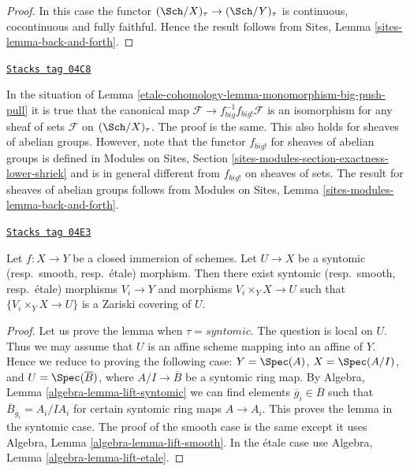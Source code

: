 \begin{proof}
In this case the functor $(\Sch/X)_\tau \to (\Sch/Y)_\tau$
is continuous, cocontinuous and fully faithful. Hence the result follows from
Sites, Lemma \ref{sites-lemma-back-and-forth}.
\end{proof}

\begin{remark}
\label{etale-cohomology-remark-push-pull-shriek}
\href{https://stacks.math.columbia.edu/tag/04C8}{\texttt{Stacks tag 04C8}}

In the situation of
Lemma \ref{etale-cohomology-lemma-monomorphism-big-push-pull}
it is true that the canonical map
$\mathcal{F} \to f_{big}^{-1}f_{big!}\mathcal{F}$
is an isomorphism for any sheaf of sets $\mathcal{F}$ on
$(\Sch/X)_\tau$. The proof is the same. This also
holds for sheaves of abelian groups. However, note
that the functor $f_{big!}$ for sheaves of abelian groups is defined in
Modules on Sites, Section \ref{sites-modules-section-exactness-lower-shriek}
and is in general different from $f_{big!}$ on sheaves of sets.
The result for sheaves of abelian groups follows from
Modules on Sites, Lemma \ref{sites-modules-lemma-back-and-forth}.
\end{remark}

\begin{lemma}
\label{etale-cohomology-lemma-closed-immersion-cover-from-below}
\href{https://stacks.math.columbia.edu/tag/04E3}{\texttt{Stacks tag 04E3}}

Let $f : X \to Y$ be a closed immersion of schemes.
Let $U \to X$ be a syntomic (resp.\ smooth, resp.\ \'etale) morphism.
Then there exist syntomic (resp.\ smooth, resp.\ \'etale) morphisms
$V_i \to Y$ and morphisms $V_i \times_Y X \to U$ such that
$\{V_i \times_Y X \to U\}$ is a Zariski covering of $U$.
\end{lemma}

\begin{proof}
Let us prove the lemma when $\tau = syntomic$.
The question is local on $U$. Thus we may assume that $U$ is
an affine scheme mapping into an affine of $Y$.
Hence we reduce to proving the following case:
$Y = \Spec(A)$, $X = \Spec(A/I)$, and
$U = \Spec(\overline{B})$, where
$A/I \to \overline{B}$ be a syntomic ring map.
By Algebra, Lemma \ref{algebra-lemma-lift-syntomic}
we can find elements $\overline{g}_i \in \overline{B}$
such that
$\overline{B}_{\overline{g}_i} = A_i/IA_i$ for certain syntomic ring maps
$A \to A_i$.
This proves the lemma in the syntomic case.
The proof of the smooth case is the same except it uses
Algebra, Lemma \ref{algebra-lemma-lift-smooth}.
In the \'etale case use
Algebra, Lemma \ref{algebra-lemma-lift-etale}.
\end{proof}

